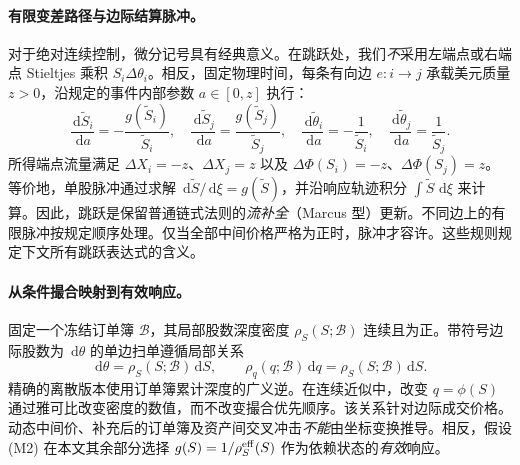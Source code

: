 \documentclass[11pt]{article}
\numberwithin{equation}{section}
\theoremstyle{definition}
\theoremstyle{remark}
\newcommand{\dd}{\,\mathrm{d}}
\begin{document}
\paragraph{有限变差路径与边际结算脉冲。}
对于绝对连续控制，微分记号具有经典意义。在跳跃处，我们\emph{不}采用左端点或右端点 Stieltjes 乘积 $S_i\Delta\theta_i$。相反，固定物理时间，每条有向边 $e:i\to j$ 承载美元质量 $z>0$，沿规定的事件内部参数 $a\in[0,z]$ 执行：
\begin{equation}\label{eq:pulse-flow}
\frac{\dd \widetilde S_i}{\dd a}=-\frac{g(\widetilde S_i)}{\widetilde S_i},\quad
\frac{\dd \widetilde S_j}{\dd a}=\frac{g(\widetilde S_j)}{\widetilde S_j},\quad
\frac{\dd\widetilde\theta_i}{\dd a}=-\frac{1}{\widetilde S_i},\quad
\frac{\dd\widetilde\theta_j}{\dd a}=\frac{1}{\widetilde S_j}.
\end{equation}
所得端点流量满足 $\Delta X_i=-z$、$\Delta X_j=z$ 以及 $\Delta\Phi(S_i)=-z$、$\Delta\Phi(S_j)=z$。等价地，单股脉冲通过求解 $\dd\widetilde S/\dd\xi=g(\widetilde S)$，并沿响应轨迹积分 $\int\widetilde S\,\dd\xi$ 来计算。因此，跳跃是保留普通链式法则的\emph{流补全}（Marcus 型）更新。不同边上的有限脉冲按规定顺序处理。仅当全部中间价格严格为正时，脉冲才容许。这些规则规定下文所有跳跃表达式的含义。

\paragraph{从条件撮合映射到有效响应。} 固定一个冻结订单簿 $\mathcal B$，其局部股数深度密度 $\rho_S(S;\mathcal B)$ 连续且为正。带符号边际股数为 $\dd\theta$ 的单边扫单遵循局部关系
\begin{equation}\label{eq:frozen-depth}
\dd\theta=\rho_S(S;\mathcal B)\dd S,
\qquad \rho_q(q;\mathcal B)\dd q=\rho_S(S;\mathcal B)\dd S.
\end{equation}
精确的离散版本使用订单簿累计深度的广义逆。在连续近似中，改变 $q=\phi(S)$ 通过雅可比改变密度的数值，而不改变撮合优先顺序。该关系针对边际成交价格。动态中间价、补充后的订单簿及资产间交叉冲击\emph{不能}由坐标变换推导。相反，假设 (M2) 在本文其余部分选择 $g(S)=1/\rho_S^{\rm eff}(S)$ 作为依赖状态的\emph{有效}响应。
\end{document}
